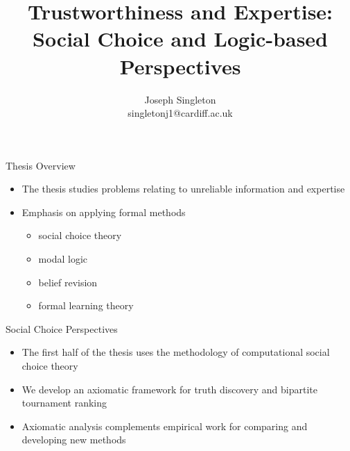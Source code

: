 \documentclass[10pt]{beamer}
\title{
    Trustworthiness and Expertise: Social Choice and Logic-based Perspectives
}
\date{}
\author{
    Joseph Singleton
    \\singletonj1@cardiff.ac.uk
}
\begin{document}
\maketitle

\begin{frame}{Thesis Overview}
    \begin{itemize}
        \item The thesis studies problems relating to \alert{unreliable
              information} and \alert{expertise}
        \item Emphasis on applying formal methods
        \begin{itemize}
            \item social choice theory
            \item modal logic
            \item belief revision
            \item formal learning theory
        \end{itemize}
    \end{itemize}
\end{frame}

\begin{frame}{Social Choice Perspectives}
    \begin{itemize}
        \item The first half of the thesis uses the methodology of
              computational social choice theory
          \item We develop an axiomatic framework for \alert{truth discovery}
              and \alert{bipartite tournament ranking}
        \item Axiomatic analysis complements empirical work for comparing and
              developing new methods
    \end{itemize}
\end{frame}
\end{document}
